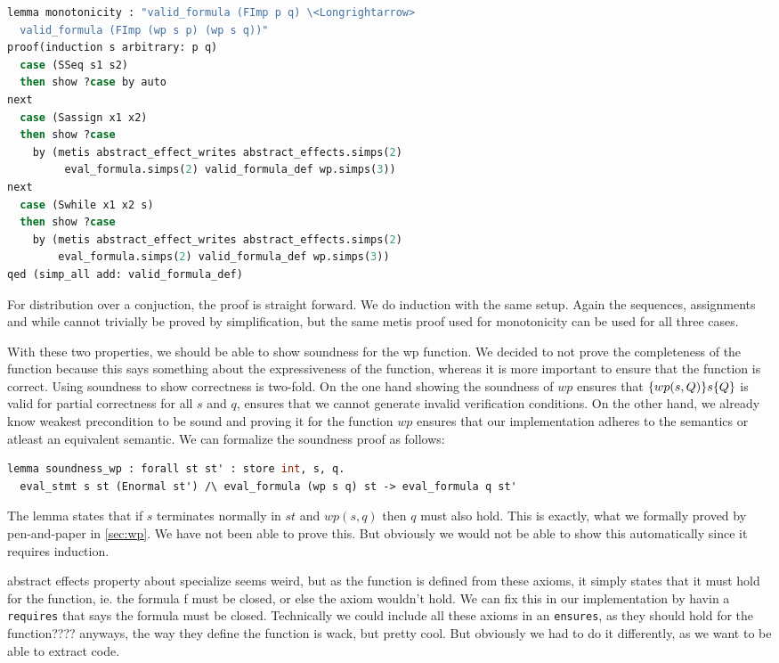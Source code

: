 \begin{lstlisting}[caption={Proof of monotonicity in Isabelle},label={lst:isamono},language=sml]
lemma monotonicity : "valid_formula (FImp p q) \<Longrightarrow>
  valid_formula (FImp (wp s p) (wp s q))"
proof(induction s arbitrary: p q)
  case (SSeq s1 s2)
  then show ?case by auto
next
  case (Sassign x1 x2)
  then show ?case
    by (metis abstract_effect_writes abstract_effects.simps(2)
         eval_formula.simps(2) valid_formula_def wp.simps(3))
next
  case (Swhile x1 x2 s)
  then show ?case
    by (metis abstract_effect_writes abstract_effects.simps(2)
        eval_formula.simps(2) valid_formula_def wp.simps(3))
qed (simp_all add: valid_formula_def)
\end{lstlisting}

For distribution over a conjuction, the proof is straight forward.
We do induction with the same setup.
Again the sequences, assignments and while cannot trivially be proved by simplification,
but the same metis proof used for monotonicity can be used for all three cases.

With these two properties, we should be able to show soundness for the wp function.
We decided to not prove the completeness of the function because this says something about the expressiveness of the function, whereas it is more important to ensure that
the function is correct.
Using soundness to show correctness is two-fold.
On the one hand showing the soundness of $wp$ ensures that $\{wp(s,Q)\}s\{Q\}$ is valid for partial correctness for all $s$ and $q$, ensures that we cannot generate invalid verification conditions.
On the other hand, we already know weakest precondition to be sound and proving it for the function $wp$ ensures that our implementation adheres to the semantics or atleast an equivalent semantic.
We can formalize the soundness proof as follows:

\begin{lstlisting}[caption={WLP soundness lemma in Why3},label={lst:isamono},language=sml]
  lemma soundness_wp : forall st st' : store int, s, q.
  eval_stmt s st (Enormal st') /\ eval_formula (wp s q) st -> eval_formula q st'
\end{lstlisting}

The lemma states that if $s$ terminates normally in $st$ and $wp(s,q)$ then $q$ must also hold.
This is exactly, what we formally proved by pen-and-paper in \ref{sec:wp}.
We have not been able to prove this. But obviously we would not be able to show this automatically since it requires induction.

abstract effects property about specialize seems weird, but as the function is defined
from these axioms, it simply states that it must hold for the function, ie. the formula f
must be closed, or else the axiom wouldn't hold.
We can fix this in our implementation by havin a \texttt{requires} that says the formula
must be closed.
Technically we could include all these axioms in an \texttt{ensures}, as they should hold
for the function???? anyways, the way they define the function is wack, but pretty cool.
But obviously we had to do it differently, as we want to be able to extract code.

